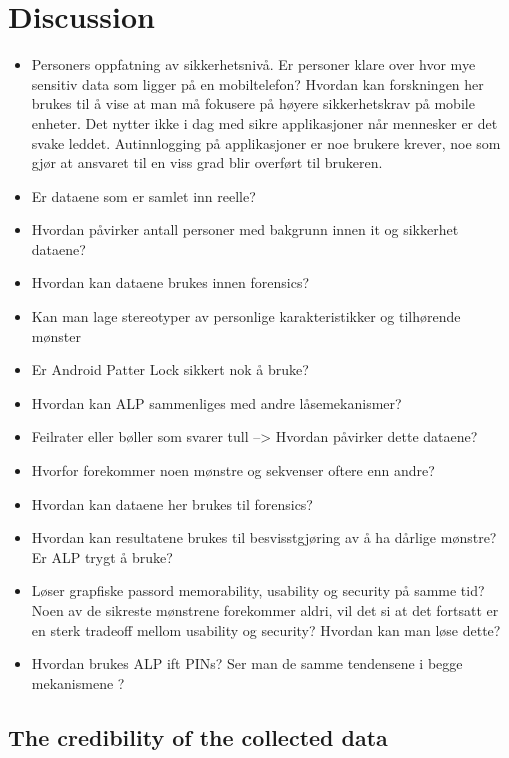 \chapter{Discussion}\label{chap:discussion}

	\begin{itemize}
		\item Personers oppfatning av sikkerhetsnivå. Er personer klare over hvor mye sensitiv data som ligger på en mobiltelefon? Hvordan kan forskningen her brukes til å vise at man må fokusere på høyere sikkerhetskrav på mobile enheter. Det nytter ikke i dag med sikre applikasjoner når mennesker er det svake leddet. Autinnlogging på applikasjoner er noe brukere krever, noe som gjør at ansvaret til en viss grad blir overført til brukeren.
		\item Er dataene som er samlet inn reelle? 
		\item Hvordan påvirker antall personer med bakgrunn innen it og sikkerhet dataene?
		\item Hvordan kan dataene brukes innen forensics?
		\item Kan man lage stereotyper av personlige karakteristikker og tilhørende mønster
		\item Er Android Patter Lock sikkert nok å bruke?
		\item Hvordan kan ALP sammenliges med andre låsemekanismer?
		\item Feilrater eller bøller som svarer tull --> Hvordan påvirker dette dataene?
		\item Hvorfor forekommer noen mønstre og sekvenser oftere enn andre?
		\item Hvordan kan dataene her brukes til forensics?
		\item Hvordan kan resultatene brukes til besvisstgjøring av å ha dårlige mønstre? Er ALP trygt å bruke?
		\item Løser grapfiske passord memorability, usability og security på samme tid? Noen av de sikreste mønstrene forekommer aldri, vil det si at det fortsatt er en sterk tradeoff mellom usability og security? Hvordan kan man løse dette?
		\item Hvordan brukes ALP ift PINs? Ser man de samme tendensene i begge mekanismene ?
	\end{itemize}

\section{The credibility of the collected data} \label{sec:credibilityofdata}
	


